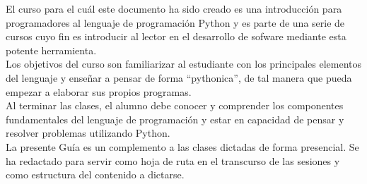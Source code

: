 El curso para el cuál este documento ha sido creado es una introducción para programadores al lenguaje de programación Python y es parte de una serie de cursos cuyo fin es introducir al lector en el desarrollo de sofware mediante esta potente herramienta.\\

Los objetivos del curso son familiarizar al estudiante con los principales elementos del lenguaje y enseñar a pensar de forma ``pythonica'', de tal manera que pueda empezar a elaborar sus propios programas.\\

Al terminar las clases, el alumno debe conocer y comprender los componentes fundamentales del lenguaje de programación y estar en capacidad de pensar y resolver problemas utilizando Python.\\

La presente Guía es un complemento a las clases dictadas de forma presencial. Se ha redactado para servir como hoja de ruta en el transcurso de las sesiones y como estructura del contenido a dictarse. \\